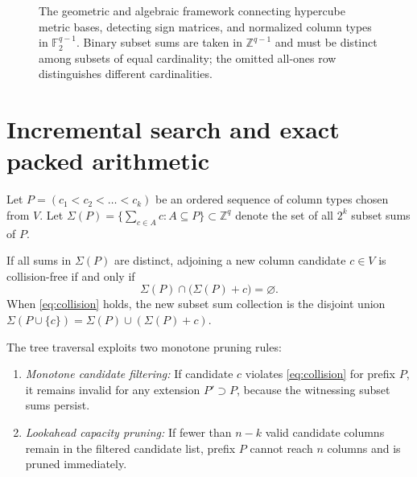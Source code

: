 \documentclass[11pt]{article}
\theoremstyle{plain}
\theoremstyle{definition}
\begin{document}
\begin{figure}[t]
\caption{The geometric and algebraic framework connecting hypercube metric bases, detecting sign matrices, and normalized column types in $\mathbb{F}_2^{q-1}$. Binary subset sums are taken in $\mathbb{Z}^{q-1}$ and must be distinct among subsets of equal cardinality; the omitted all-ones row distinguishes different cardinalities.}
\label{fig:framework}
\end{figure}

\section{Incremental search and exact packed arithmetic}\label{sec:dfs}

Let $P = (c_1 < c_2 < \dots < c_k)$ be an ordered sequence of column types chosen from $V$. Let $\Sigma(P) = \{ \sum_{c \in A} c : A \subseteq P \} \subset \mathbb{Z}^q$ denote the set of all $2^k$ subset sums of $P$.

If all sums in $\Sigma(P)$ are distinct, adjoining a new column candidate $c \in V$ is collision-free if and only if
\begin{equation}\label{eq:collision}
  \Sigma(P) \cap \bigl(\Sigma(P) + c\bigr) = \varnothing.
\end{equation}
When \eqref{eq:collision} holds, the new subset sum collection is the disjoint union $\Sigma(P \cup \{c\}) = \Sigma(P) \cup (\Sigma(P) + c)$.

The tree traversal exploits two monotone pruning rules:
\begin{enumerate}[label=(\alph*)]
\item \emph{Monotone candidate filtering:} If candidate $c$ violates \eqref{eq:collision} for prefix $P$, it remains invalid for any extension $P' \supset P$, because the witnessing subset sums persist.
\item \emph{Lookahead capacity pruning:} If fewer than $n - k$ valid candidate columns remain in the filtered candidate list, prefix $P$ cannot reach $n$ columns and is pruned immediately.
\end{enumerate}
\end{document}
